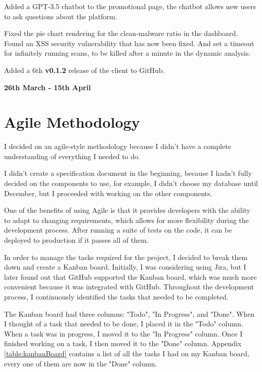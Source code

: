 Added a GPT-3.5 chatbot to the promotional page,
the chatbot allows new users to ask questions about the platform.

Fixed the pie chart rendering for the clean-malware ratio in the dashboard.
Found an XSS security vulnerability that has now been fixed.
And set a timeout for infinitely running scans,
to be killed after a minute in the dynamic analysis.

Added a 6th \textbf{v0.1.2} release of the client to GitHub.

\textbf{26th March - 15th April}
% 

\section{Agile Methodology}
I decided on an agile-style methodology because
I didn't have a complete understanding of everything I needed to do.

I didn't create a specification document in the beginning,
because I hadn't fully decided on the components to use,
for example, I didn't choose my database until December,
but I proceeded with working on the other components.

One of the benefits of using Agile is that it provides developers
with the ability to adapt to changing requirements,
which allows for more flexibility during the development process.
After running a suite of tests on the code,
it can be deployed to production if it passes all of them.

In order to manage the tasks required for the project,
I decided to break them down and create a Kanban board.
Initially, I was considering using Jira, but I later found out that
GitHub supported the Kanban board,
which was much more convenient because it was integrated with GitHub.
Throughout the development process,
I continuously identified the tasks that needed to be completed.

The Kanban board had three columns: "Todo", "In Progress", and "Done".
When I thought of a task that needed to be done,
I placed it in the "Todo" column.
When a task was in progress, I moved it to the "In Progress" column.
Once I finished working on a task, I then moved it to the "Done" column.
Appendix \ref{table:kanbanBoard} contains a list of
all the tasks I had on my Kanban board,
every one of them are now in the "Done" column.

